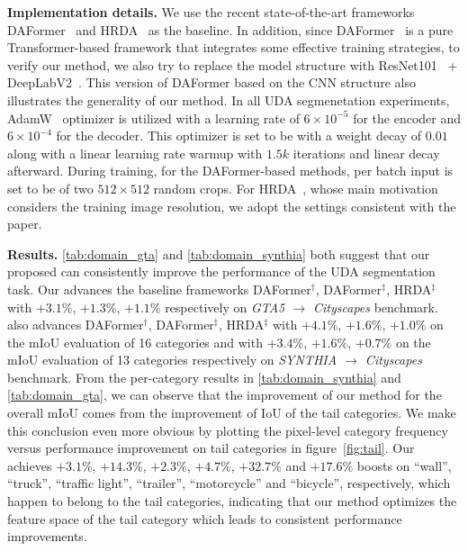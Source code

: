 %
\noindent\textbf{Implementation details.} We use the recent state-of-the-art frameworks DAFormer~\cite{hoyer2022daformer} and HRDA~\cite{hoyer2022hrda} as the baseline.
%
In addition, since DAFormer~\cite{hoyer2022daformer} is a pure Transformer-based framework that integrates some effective training strategies, to verify our method, we also try to replace the model structure with ResNet101~\cite{he2016deep} + DeepLabV2~\cite{deeplab}.
%
This version of DAFormer based on the CNN structure also illustrates the generality of our method.
%
In all UDA segmenetation experiments, AdamW~\cite{dozat2016incorporating} optimizer is utilized with a learning rate of $6\times 10^{-5}$ for the encoder and $6\times 10^{-4}$ for the decoder.
%
This optimizer is set to be with a weight decay of $0.01$ along with a linear learning rate warmup with $1.5k$ iterations and linear decay afterward.
%
During training, for the DAFormer-based methods, per batch input is set to be of two $512\times 512$ random crops.
%
For HRDA~\cite{hoyer2022hrda}, whose main motivation considers the training image resolution, we adopt the settings consistent with the paper.
%



\noindent\textbf{Results.} \cref{tab:domain_gta} and \cref{tab:domain_synthia} both suggest that our proposed \method can consistently improve the performance of the UDA segmentation task.
%
Our \method advances the baseline frameworks DAFormer$^\dag$, DAFormer$^\ddag$, HRDA$^\ddag$ with $+3.1\%$, $+1.3\%$, $+1.1\%$ respectively on \textit{GTA5 $\to$ Cityscapes} benchmark.
%
\method also advances DAFormer$^\dag$, DAFormer$^\ddag$, HRDA$^\ddag$ with $+4.1\%$, $+1.6\%$, $+1.0\%$ on the mIoU evaluation of 16 categories and  with $+3.4\%$, $+1.6\%$, $+0.7\%$ on the mIoU evaluation of 13 categories respectively on \textit{SYNTHIA $\to$ Cityscapes} benchmark.
%
From the per-category results in \cref{tab:domain_synthia} and \cref{tab:domain_gta}, we can observe that the improvement of our method for the overall mIoU comes from the improvement of IoU of the tail categories.
%
We make this conclusion even more obvious by plotting the pixel-level category frequency versus performance improvement on tail categories in figure~\cref{fig:tail}.
%
Our \method achieves $+3.1\%$, $+14.3\%$, $+2.3\%$, $+4.7\%$, $+32.7\%$ and $+17.6\%$ boosts on ``wall'', ``truck'', ``traffic light'', ``trailer'', ``motorcycle'' and ``bicycle'', respectively, which happen to belong to the tail categories, indicating that our method optimizes the feature space of the tail category which leads to consistent performance improvements.
%


